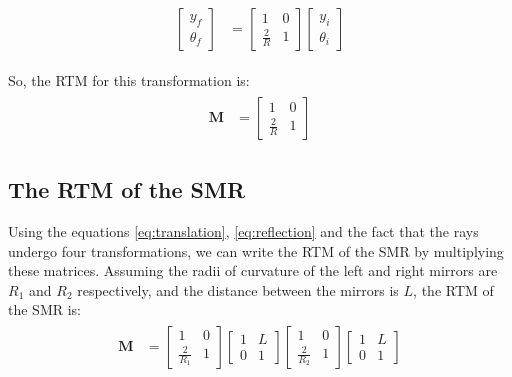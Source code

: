 \documentclass[12pt]{article}
\begin{document}
\begin{align}
    \begin{split}
        \begin{bmatrix}
            y_f \\
            \theta_f
        \end{bmatrix} & = \begin{bmatrix}
            1           & 0 \\
            \frac{2}{R} & 1
        \end{bmatrix} \begin{bmatrix}
            y_i \\
            \theta_i
        \end{bmatrix}
    \end{split}
\end{align}

So, the RTM for this transformation is:
\begin{align}
    \label{eq:reflection}
    \begin{split}
        \mathbf{M} & = \begin{bmatrix}
            1           & 0 \\
            \frac{2}{R} & 1
        \end{bmatrix}
    \end{split}
\end{align}

\subsection{The RTM of the SMR}
Using the equations \ref{eq:translation}, \ref{eq:reflection} and the fact that the rays undergo four transformations, we can write the RTM of the SMR by multiplying these matrices. Assuming the radii of curvature of the left and right mirrors are \(R_1\) and \(R_2\) respectively, and the distance between the mirrors is \(L\), the RTM of the SMR is:
\begin{align}
    \label{fig:RTM-SMR}
    \begin{split}
        \mathbf{M} & = \begin{bmatrix}
            1             & 0 \\
            \frac{2}{R_1} & 1
        \end{bmatrix}
        \begin{bmatrix}
            1 & L \\
            0 & 1
        \end{bmatrix}
        \begin{bmatrix}
            1             & 0 \\
            \frac{2}{R_2} & 1
        \end{bmatrix}
        \begin{bmatrix}
            1 & L \\
            0 & 1
        \end{bmatrix}
    \end{split}
\end{align}
\end{document}
